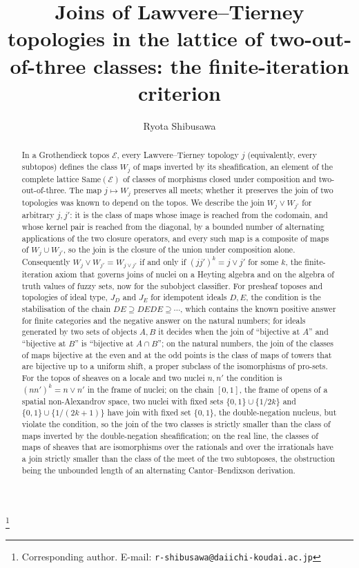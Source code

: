 \documentclass[11pt]{amsart}
\theoremstyle{definition}
\newcommand{\Same}{\mathrm{Same}}
\newcommand{\cE}{\mathcal E}
\begin{document}
\title[Joins of topologies and the sameness lattice]{Joins of Lawvere--Tierney topologies in the lattice of two-out-of-three classes: the finite-iteration criterion}
\author{Ryota Shibusawa}
\thanks{Corresponding author. E-mail: \texttt{r-shibusawa@daiichi-koudai.ac.jp}}
\address{Daiichi Institute of Technology}

\begin{abstract}
In a Grothendieck topos $\cE$, every Lawvere--Tierney topology $j$ (equivalently,
every subtopos) defines the class $W_j$ of maps inverted by its sheafification,
an element of the complete lattice $\Same(\cE)$ of classes of morphisms closed
under composition and two-out-of-three. The map $j\mapsto W_j$ preserves all
meets; whether it preserves the join of two topologies was known to depend on
the topos. We describe the join $W_j\vee W_{j'}$ for arbitrary $j,j'$: it is
the class of maps whose image is reached from the codomain, and whose kernel
pair is reached from the diagonal, by a bounded number of alternating
applications of the two closure operators, and every such map is a composite
of maps of $W_j\cup W_{j'}$, so the join is the closure of the union under
composition alone. Consequently $W_j\vee W_{j'}=W_{j\vee j'}$ if and only if
$(jj')^k=j\vee j'$ for some $k$, the finite-iteration axiom that governs joins
of nuclei on a Heyting algebra and on the algebra of truth values of fuzzy
sets, now for the subobject classifier. For presheaf toposes and topologies
of ideal type, $J_D$ and $J_E$ for idempotent ideals $D,E$, the condition is
the stabilisation of the chain $DE\supseteq DEDE\supseteq\cdots$, which
contains the known positive answer for finite categories and the negative
answer on the natural numbers; for ideals generated by two sets of objects
$A,B$ it decides when the join of ``bijective at $A$'' and ``bijective at $B$''
is ``bijective at $A\cap B$''; on the natural numbers, the join of the classes
of maps bijective at the even and at the odd points is the class of maps of
towers that are bijective up to a uniform shift, a proper subclass of the
isomorphisms of pro-sets. For the topos of sheaves on a locale and two
nuclei $n,n'$ the condition is $(nn')^k=n\vee n'$ in the frame of nuclei;
on the chain $[0,1]$, the frame of opens of a spatial non-Alexandrov space,
two nuclei with fixed sets $\{0,1\}\cup\{1/2k\}$ and $\{0,1\}\cup\{1/(2k+1)\}$
have join with fixed set $\{0,1\}$, the double-negation nucleus, but violate
the condition, so the join of the two classes is strictly smaller than the
class of maps inverted by the double-negation sheafification; on the real
line, the classes of maps of sheaves that are isomorphisms over the
rationals and over the irrationals have a join strictly smaller than the
class of the meet of the two subtoposes, the obstruction being the
unbounded length of an alternating Cantor--Bendixson derivation.
\end{abstract}
\end{document}
